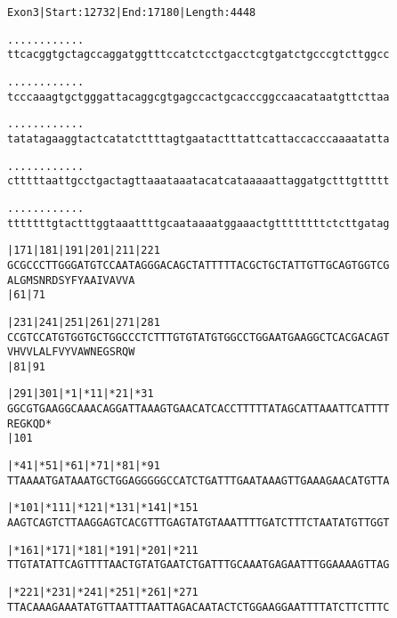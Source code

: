 \documentclass{article}
\begin{document}
\newpage
\begin{alltt}
Exon 3 | Start: 12732 | End: 17180 | Length: 4448

.    .    .    .    .    .    .    .    .    .    .    .    
ttcacggtgctagccaggatggtttccatctcctgacctcgtgatctgcccgtcttggcc

.    .    .    .    .    .    .    .    .    .    .    .    
tcccaaagtgctgggattacaggcgtgagccactgcacccggccaacataatgttcttaa

.    .    .    .    .    .    .    .    .    .    .    .    
tatatagaaggtactcatatcttttagtgaatactttattcattaccacccaaaatatta

.    .    .    .    .    .    .    .    .    .    .    .    
ctttttaattgcctgactagttaaataaatacatcataaaaattaggatgctttgttttt

.    .    .    .    .    .    .    .    .    .    .    .    
tttttttgtactttggtaaattttgcaataaaatggaaactgttttttttctcttgatag

       |171      |181      |191      |201      |211      |221
GCGCCCTTGGGATGTCCAATAGGGACAGCTATTTTTACGCTGCTATTGTTGCAGTGGTCG
  A  L  G  M  S  N  R  D  S  Y  F  Y  A  A  I  V  A  V  V  A
                 |61                           |71          

       |231      |241      |251      |261      |271      |281
CCGTCCATGTGGTGCTGGCCCTCTTTGTGTATGTGGCCTGGAATGAAGGCTCACGACAGT
  V  H  V  V  L  A  L  F  V  Y  V  A  W  N  E  G  S  R  Q  W
                 |81                           |91          

       |291      |301  |*1       |*11      |*21      |*31   
GGCGTGAAGGCAAACAGGATTAAAGTGAACATCACCTTTTTATAGCATTAAATTCATTTT
  R  E  G  K  Q  D  *   
                 |101                                       

   |*41      |*51      |*61      |*71      |*81      |*91   
TTAAAATGATAAATGCTGGAGGGGGCCATCTGATTTGAATAAAGTTGAAAGAACATGTTA

   |*101     |*111     |*121     |*131     |*141     |*151  
AAGTCAGTCTTAAGGAGTCACGTTTGAGTATGTAAATTTTGATCTTTCTAATATGTTGGT

   |*161     |*171     |*181     |*191     |*201     |*211  
TTGTATATTCAGTTTTAACTGTATGAATCTGATTTGCAAATGAGAATTTGGAAAAGTTAG

   |*221     |*231     |*241     |*251     |*261     |*271  
TTACAAAGAAATATGTTAATTTAATTAGACAATACTCTGGAAGGAATTTTATCTTCTTTC

\end{alltt}
\newpage
\end{document}
